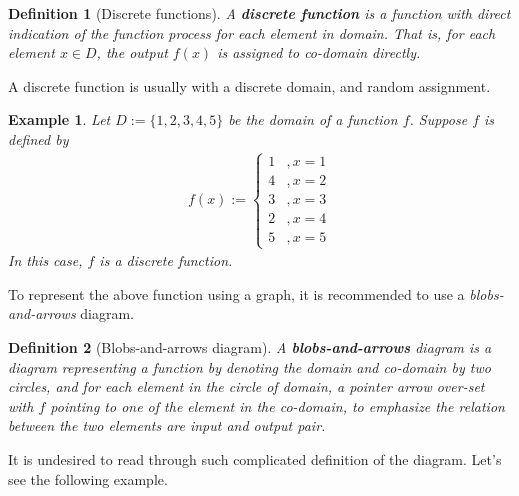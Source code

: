 \documentclass[12pt]{article}
\newtheorem{definition}{Definition}[section]
\newtheorem*{example}{Example}
\begin{document}
    \begin{definition}[Discrete functions]
        A \textbf{discrete function} is a function with direct indication of the function process for each element in domain. That is, for each element $x\in D$, the output $f(x)$ is assigned to co-domain directly.
    \end{definition}

    A discrete function is usually with a discrete domain, and random assignment.

    \begin{example}
        Let $D:=\{1,2,3,4,5\}$ be the domain of a function $f$. Suppose $f$ is defined by \begin{align*}
            f(x):=\begin{cases}
                1&,x=1\\4&,x=2\\3&,x=3\\2&,x=4\\5&,x=5
            \end{cases}
        \end{align*}
        In this case, $f$ is a discrete function.
    \end{example}

    To represent the above function using a graph, it is recommended to use a \textit{blobs-and-arrows} diagram.
    
    \begin{definition}[Blobs-and-arrows diagram]
        A \textbf{blobs-and-arrows} diagram is a diagram representing a function by denoting the domain and co-domain by two circles, and for each element in the circle of domain, a pointer arrow over-set with $f$ pointing to one of the element in the co-domain, to emphasize the relation between the two elements are input and output pair.
    \end{definition}

    It is undesired to read through such complicated definition of the diagram. Let's see the following example.
\end{document}

